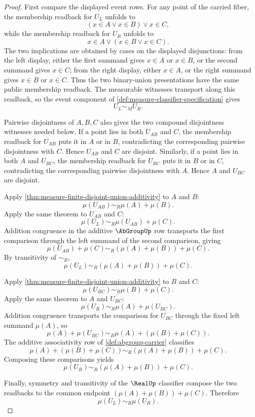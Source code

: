 \begin{proof}
First compare the displayed event rows. For any point of the carried fiber,
the membership readback for $U_L$ unfolds to
$$
(x\in A\vee x\in B)\vee x\in C,
$$
while the membership readback for $U_R$ unfolds to
$$
x\in A\vee (x\in B\vee x\in C).
$$
The two implications are obtained by cases on the displayed disjunctions:
from the left display, either the first summand gives $x\in A$ or $x\in B$, or
the second summand gives $x\in C$; from the right display, either $x\in A$, or
the right summand gives $x\in B$ or $x\in C$. Thus the two binary-union
presentations have the same public membership readback. The measurable
witnesses transport along this readback, so the event component of
\autoref{def:measure-classifier-specification} gives
$$
U_L\sim_M U_R.
$$

Pairwise disjointness of $A,B,C$ also gives the two compound disjointness
witnesses needed below. If a point lies in both $U_{AB}$ and $C$, the
membership readback for $U_{AB}$ puts it in $A$ or in $B$, contradicting the
corresponding pairwise disjointness with $C$. Hence $U_{AB}$ and $C$ are
disjoint. Similarly, if a point lies in both $A$ and $U_{BC}$, the membership
readback for $U_{BC}$ puts it in $B$ or in $C$, contradicting the corresponding
pairwise disjointness with $A$. Hence $A$ and $U_{BC}$ are disjoint.

Apply \autoref{thm:measure-finite-disjoint-union-additivity} to $A$ and $B$:
$$
\mu(U_{AB})\sim_R\mu(A)+\mu(B).
$$
Apply the same theorem to $U_{AB}$ and $C$:
$$
\mu(U_L)\sim_R\mu(U_{AB})+\mu(C).
$$
Addition congruence in the additive $\AbGroupUp$ row transports the first
comparison through the left summand of the second comparison, giving
$$
\mu(U_{AB})+\mu(C)\sim_R(\mu(A)+\mu(B))+\mu(C).
$$
By transitivity of $\sim_R$,
$$
\mu(U_L)\sim_R(\mu(A)+\mu(B))+\mu(C).
$$

Apply \autoref{thm:measure-finite-disjoint-union-additivity} to $B$ and $C$:
$$
\mu(U_{BC})\sim_R\mu(B)+\mu(C).
$$
Apply the same theorem to $A$ and $U_{BC}$:
$$
\mu(U_R)\sim_R\mu(A)+\mu(U_{BC}).
$$
Addition congruence transports the comparison for $U_{BC}$ through the fixed
left summand $\mu(A)$, so
$$
\mu(A)+\mu(U_{BC})\sim_R\mu(A)+(\mu(B)+\mu(C)).
$$
The additive associativity row of \autoref{def:abgroup-carrier} classifies
$$
\mu(A)+(\mu(B)+\mu(C))\sim_R(\mu(A)+\mu(B))+\mu(C).
$$
Composing these comparisons yields
$$
\mu(U_R)\sim_R(\mu(A)+\mu(B))+\mu(C).
$$

Finally, symmetry and transitivity of the $\RealUp$ classifier compose the two
readbacks to the common endpoint $(\mu(A)+\mu(B))+\mu(C)$. Therefore
$$
\mu(U_L)\sim_R\mu(U_R).
$$
\end{proof}
